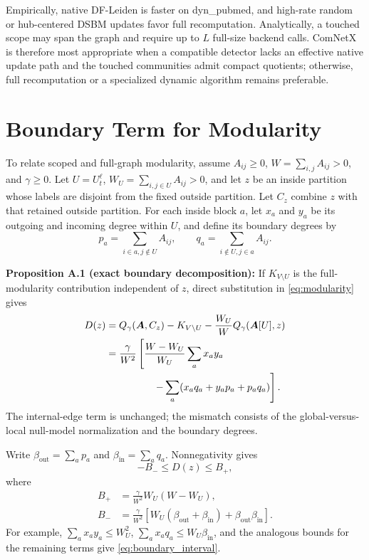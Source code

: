 \documentclass{ieeeaccess}
\begin{document}
Empirically, native DF-Leiden is faster on dyn\_pubmed, and high-rate random or
hub-centered DSBM updates favor full recomputation. Analytically, a touched
scope may span the graph and require up to $L$ full-size backend calls. ComNetX
is therefore most appropriate when a compatible detector lacks an effective
native update path and the touched communities admit compact quotients;
otherwise, full recomputation or a specialized dynamic algorithm remains
preferable.

\appendices

\section{Boundary Term for Modularity}
\label{app:boundary}

To relate scoped and full-graph modularity, assume $A_{ij}\ge0$,
$W=\sum_{i,j}A_{ij}>0$, and
$\gamma\ge0$. Let $U=U_t^\ell$,
$W_U=\sum_{i,j\in U}A_{ij}>0$, and let $z$ be an inside partition whose labels
are disjoint from the fixed outside partition. Let $C_z$ combine $z$ with that
retained outside partition. For each inside block $a$, let $x_a$ and $y_a$ be
its outgoing and incoming degree within $U$, and define its boundary degrees by
\begin{equation}
p_a=\sum_{i\in a,j\notin U}A_{ij},\qquad
q_a=\sum_{i\notin U,j\in a}A_{ij}.
\label{eq:boundary_degrees}
\end{equation}

\noindent\textbf{Proposition A.1 (exact boundary decomposition):} If
$K_{V\setminus U}$ is the full-modularity contribution independent of $z$,
direct substitution in \eqref{eq:modularity} gives
\begin{equation}
\begin{aligned}
D(z)={}&Q_\gamma(\bm A,C_z)-K_{V\setminus U}
-\frac{W_U}{W}Q_\gamma(\bm{A}[U],z)\\
={}&\frac{\gamma}{W^2}\left[
\frac{W-W_U}{W_U}\sum_a x_ay_a\right.\\
&\left.\hspace{12mm}-\sum_a(x_aq_a+y_ap_a+p_aq_a)\right].
\end{aligned}
\label{eq:boundary_mismatch}
\end{equation}
The internal-edge term is unchanged; the mismatch consists of the
global-versus-local null-model normalization and the boundary degrees.

Write $\beta_{\mathrm{out}}=\sum_a p_a$ and
$\beta_{\mathrm{in}}=\sum_a q_a$. Nonnegativity gives
\begin{equation}
-B_-\le D(z)\le B_+,
\label{eq:boundary_interval}
\end{equation}
where
\begin{equation}
\begin{aligned}
B_+&=\frac{\gamma}{W^2}W_U(W-W_U),\\
B_-&=\frac{\gamma}{W^2}\left[
W_U(\beta_{\mathrm{out}}+\beta_{\mathrm{in}})
+\beta_{\mathrm{out}}\beta_{\mathrm{in}}\right].
\end{aligned}
\label{eq:boundary_bounds}
\end{equation}
For example, $\sum_a x_ay_a\le W_U^2$,
$\sum_a x_aq_a\le W_U\beta_{\mathrm{in}}$, and the analogous bounds for the
remaining terms give \eqref{eq:boundary_interval}.
\end{document}
